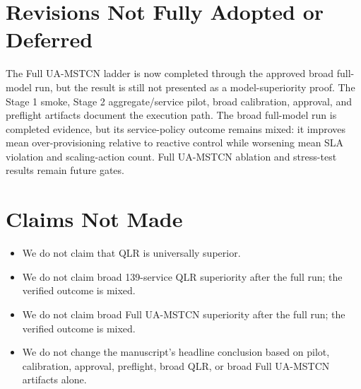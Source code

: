\documentclass[11pt]{article}
\begin{document}
\section*{Revisions Not Fully Adopted or Deferred}

The Full UA-MSTCN ladder is now completed through the approved broad full-model run, but the result is still not presented as a model-superiority proof. The Stage 1 smoke, Stage 2 aggregate/service pilot, broad calibration, approval, and preflight artifacts document the execution path. The broad full-model run is completed evidence, but its service-policy outcome remains mixed: it improves mean over-provisioning relative to reactive control while worsening mean SLA violation and scaling-action count. Full UA-MSTCN ablation and stress-test results remain future gates.

\section*{Claims Not Made}

\begin{itemize}[leftmargin=*]
\item We do not claim that QLR is universally superior.
\item We do not claim broad 139-service QLR superiority after the full run; the verified outcome is mixed.
\item We do not claim broad Full UA-MSTCN superiority after the full run; the verified outcome is mixed.
\item We do not change the manuscript's headline conclusion based on pilot, calibration, approval, preflight, broad QLR, or broad Full UA-MSTCN artifacts alone.
\end{itemize}
\end{document}
